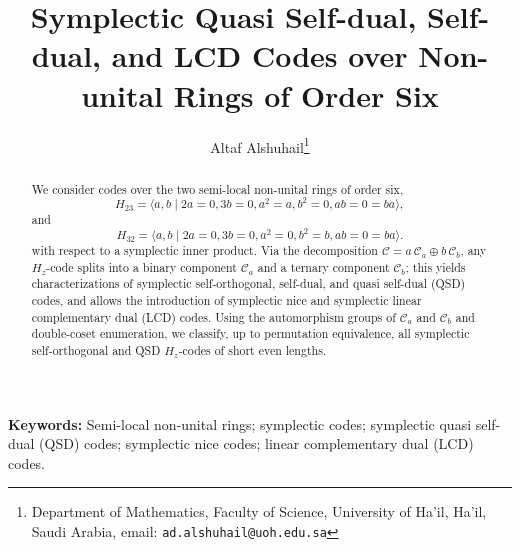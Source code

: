 \documentclass[11pt,a4paper]{article}
\title{
Symplectic  Quasi Self-dual, Self-dual, and LCD Codes over Non-unital Rings of Order Six}
\author{Altaf Alshuhail\thanks{Department of Mathematics, Faculty of Science, University of Ha’il, Ha’il, Saudi Arabia, email: \tt ad.alshuhail@uoh.edu.sa} }
\date{}
\theoremstyle{definition}
\numberwithin{equation}{section}
\def\C{{\mathcal{C}}}
\begin{document}
\maketitle

\begin{abstract}
We consider codes over the two semi-local non-unital rings of order six,
{\small \[ H_{23} = \langle a,b \mid 2a=0, 3b = 0, a^2=a, b^2 = 0, ab = 0 = ba \rangle,\]}
and
{\small \[H_{32} = \langle a,b \mid 2a=0, 3b = 0, a^2=0, b^2 = b, ab = 0 = ba \rangle. \]}
with respect to a symplectic inner product. Via the  decomposition \(\C=a\,\C_a\oplus b\,\C_b\), any \(H_z\)-code splits into a binary component \(\C_a\) and a ternary component \(\C_b\); this yields  characterizations of symplectic self-orthogonal, self-dual, and quasi self-dual (QSD) codes, and allows the introduction of symplectic nice and symplectic linear complementary dual (LCD) codes. Using the automorphism groups of \(\C_a\) and \(\C_b\) and double-coset enumeration, we classify, up to permutation equivalence, all symplectic self-orthogonal and QSD \(H_z\)-codes of short even lengths. 
\end{abstract}


\textbf{Keywords:} Semi-local non-unital rings; symplectic codes; symplectic quasi self-dual (QSD) codes; symplectic nice codes; linear complementary dual (LCD) codes.
\end{document}
